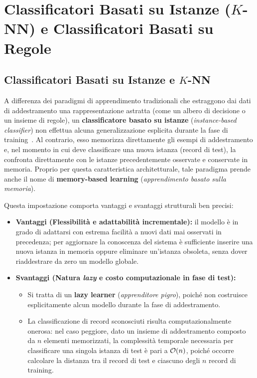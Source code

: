 \chapter{Classificatori Basati su Istanze (\texorpdfstring{$K$-NN}{K-NN}) e Classificatori Basati su Regole}
\label{ch:dm-knn-rule-based}

\section{Classificatori Basati su Istanze e \texorpdfstring{$K$-NN}{K-NN}}
\label{sec:dm-knn-intro}

A differenza dei paradigmi di apprendimento tradizionali che estraggono dai dati di addestramento una rappresentazione astratta (come un albero di decisione o un insieme di regole), un \textbf{classificatore basato su istanze} (\textit{instance-based classifier}) non effettua alcuna generalizzazione esplicita durante la fase di training~\cite{tan2018}. Al contrario, esso memorizza direttamente gli esempi di addestramento e, nel momento in cui deve classificare una nuova istanza (record di test), la confronta direttamente con le istanze precedentemente osservate e conservate in memoria. Proprio per questa caratteristica architetturale, tale paradigma prende anche il nome di \textbf{memory-based learning} (\textit{apprendimento basato sulla memoria}).

Questa impostazione comporta vantaggi e svantaggi strutturali ben precisi:
\begin{itemize}
    \item \textbf{Vantaggi (Flessibilit\`a e adattabilit\`a incrementale):} il modello \`e in grado di adattarsi con estrema facilit\`a a nuovi dati mai osservati in precedenza; per aggiornare la conoscenza del sistema \`e sufficiente inserire una nuova istanza in memoria oppure eliminare un'istanza obsoleta, senza dover riaddestrare da zero un modello globale.
    \item \textbf{Svantaggi (Natura \textit{lazy} e costo computazionale in fase di test):}
    \begin{itemize}
        \item Si tratta di un \textbf{lazy learner} (\textit{apprenditore pigro}), poich\'e non costruisce esplicitamente alcun modello durante la fase di addestramento.
        \item La classificazione di record sconosciuti risulta computazionalmente onerosa: nel caso peggiore, dato un insieme di addestramento composto da $n$ elementi memorizzati, la complessit\`a temporale necessaria per classificare una singola istanza di test \`e pari a $\mathcal{O}\!\left(n\right)$, poich\'e occorre calcolare la distanza tra il record di test e ciascuno degli $n$ record di training.
    \end{itemize}
\end{itemize}

